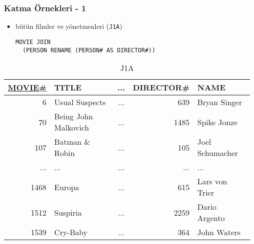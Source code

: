 \documentclass[dvipsnames]{beamer}
\theoremstyle{plain}
\begin{document}
\begin{frame}[fragile]
  \frametitle{Katma Örnekleri - 1}

    \begin{itemize}
      \item bütün filmler ve yönetmenleri (\texttt{J1A})

    \begin{lstlisting}
MOVIE JOIN
  (PERSON RENAME (PERSON# AS DIRECTOR#))
    \end{lstlisting}
    \end{itemize}

    \vspace{-10pt}
    \begin{tiny}
    \begin{table}
      \caption{J1A}
      \begin{tabular}{|r|l|c|r|l|}\hline
\underline{MOVIE\#} & TITLE & ... & DIRECTOR\# & NAME            \\[2pt]\hline\hline
   6 & Usual Suspects       & ... &     639  & Bryan Singer    \\\hline
  70 & Being John Malkovich & ... &      1485  & Spike Jonze     \\\hline
 107 & Batman \& Robin      & ... &       105  & Joel Schumacher \\\hline
 ... & ...                  & ... &       ...  & ...             \\\hline
1468 & Europa               & ... &       615  & Lars von Trier  \\\hline
1512 & Suspiria             & ... &      2259  & Dario Argento   \\\hline
1539 & Cry-Baby             & ... &       364  & John Waters     \\\hline
      \end{tabular}
    \end{table}
    \end{tiny}
\end{frame}
\end{document}

